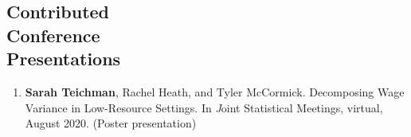 \documentclass[margin,centered]{res}
\begin{document}
\begin{resume}









\section{\sc Contributed\\ Conference\\ Presentations}
\begin{enumerate}[leftmargin=*]
\item {\bf Sarah Teichman}, Rachel Heath, and Tyler McCormick. Decomposing Wage Variance in Low-Resource Settings. In {\emph Joint Statistical Meetings}, virtual, August 2020. (Poster presentation)
\end{enumerate}


\end{resume}
\end{document}
